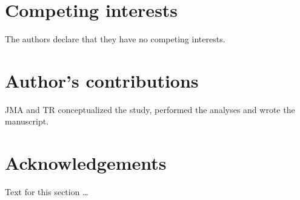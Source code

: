 \documentclass{bmcart}
\begin{document}
\begin{backmatter}

\section*{Competing interests}
  The authors declare that they have no competing interests.

\section*{Author's contributions}
 JMA and TR conceptualized the study, performed the analyses and wrote the manuscript.

\section*{Acknowledgements}
  Text for this section \ldots





\end{backmatter}
\end{document}
